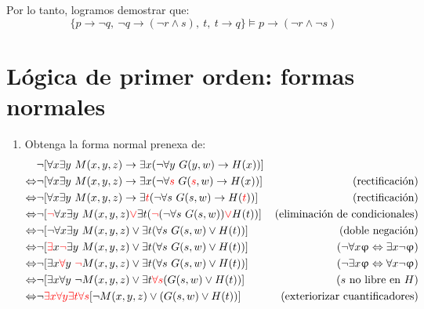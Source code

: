 \documentclass{article}
\begin{document}
Por lo tanto, logramos demostrar que:
$$\{p \rightarrow \neg q,\ \neg q \rightarrow (\neg r \land s), \ t,\ t\rightarrow q\} \vDash p \rightarrow (\neg r \land \neg s)$$


\newpage

\section{Lógica de primer orden: formas normales}

\begin{enumerate}
  \item Obtenga la forma normal prenexa de:
        \begin{align*}
          &\neg[\forall x \exists y\ M(x, y, z) \rightarrow \exists x (\neg \forall y\ G(y, w) \rightarrow H(x))] \\
          \Leftrightarrow &\neg[\forall x \exists y\ M(x, y, z) \rightarrow \exists x (\neg \forall \textcolor{red}{s}\ G(\textcolor{red}{s}, w) \rightarrow H(x))] & (\text{rectificación})\\
          \Leftrightarrow &\neg[\forall x \exists y\ M(x, y, z) \rightarrow \exists \textcolor{red}{t} (\neg \forall s\ G(s, w) \rightarrow H(\textcolor{red}{t}))] & (\text{rectificación})\\
          \Leftrightarrow &\neg[\textcolor{red}{\neg} \forall x \exists y\ M(x, y, z) \textcolor{red}{\vee} \exists t (\textcolor{red}{\neg} (\neg \forall s\ G(s, w)) \textcolor{red}{\vee} H(t))] & (\text{eliminación de condicionales})\\
          \Leftrightarrow &\neg[\neg \forall x \exists y\ M(x, y, z) \vee \exists t (\forall s\ G(s, w) \vee H(t))] & (\text{doble negación})\\
          \Leftrightarrow &\neg[\textcolor{red}{\exists} x \textcolor{red}{\neg} \exists y\ M(x, y, z) \vee \exists t (\forall s\ G(s, w) \vee H(t))] & (\neg \forall x \upvarphi \Leftrightarrow \exists x \neg \upvarphi)\\
          \Leftrightarrow &\neg[\exists x \textcolor{red}{\forall} y\ \textcolor{red}{\neg} M(x, y, z) \vee \exists t (\forall s\ G(s, w) \vee H(t))] & (\neg \exists x \upvarphi \Leftrightarrow \forall x \neg \upvarphi)\\
          \Leftrightarrow &\neg[\exists x \forall y\ \neg M(x, y, z) \vee \exists t \textcolor{red}{\forall s} (G(s, w) \vee H(t))] & (s \text{ no libre en } H)\\
          \Leftrightarrow &\neg \textcolor{red}{\exists x} \textcolor{red}{\forall y} \textcolor{red}{\exists t} \textcolor{red}{\forall s}[\neg M(x, y, z) \vee (G(s, w) \vee H(t))] & (\text{exteriorizar cuantificadores})\\

\end{align*}
\end{enumerate}
\end{document}
